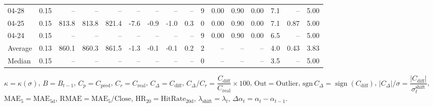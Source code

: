 \begin{threeparttable}
{\begin{tabular}{lrrrrrrrrrrrrrrr}
  04-28 &     0.15 &    -- &    -- &    -- &         -- &             -- &                       -- &                  -- &              9 &       0.00 &      0.90 &           0.00 &              7.1 &              -- &                   5.00 \\
  04-25 &     0.15 & 813.8 & 813.8 & 821.4 &       -7.6 &           -0.9 &                     -1.0 &                 0.3 &              0 &       0.00 &      0.90 &           0.00 &              7.1 &            0.87 &                   5.00 \\
  04-24 &     0.15 &    -- &    -- &    -- &         -- &             -- &                       -- &                  -- &              9 &       0.00 &      0.90 &           0.00 &              6.5 &              -- &                   5.00 \\
Average &     0.13 & 860.1 & 860.3 & 861.5 &       -1.3 &           -0.1 &                     -0.1 &                 0.2 &              2 &         -- &        -- &             -- &              4.0 &            0.43 &                   3.83 \\
 Median &     0.15 &    -- &    -- &    -- &         -- &             -- &                       -- &                  -- &              0 &         -- &        -- &             -- &              3.5 &              -- &                   5.00 \\
\bottomrule
\end{tabular}
}
\begin{tablenotes}\footnotesize
\item $\kappa=\kappa(\sigma)$, $B=B_{t-1}$, $C_p=C_{\text{pred}}$, $C_r=C_{\text{real}}$, $C_\Delta=C_{\text{diff}}$, $C_\Delta/C_r=\dfrac{C_{\text{diff}}}{C_{\text{real}}}\times100$, $\mathrm{Out}=\text{Outlier}$, $\mathrm{sgn}\,C_\Delta=\operatorname{sign}(C_{\text{diff}})$, $|C_\Delta|/\sigma=\dfrac{|C_{\text{diff}}|}{\sigma_t^{\text{shift}}}$, $\mathrm{MAE}_5=\mathrm{MAE}_{5\text{d}}$, $\mathrm{RMAE}= \mathrm{MAE}_5 / \text{Close}$, $\mathrm{HR}_{20}=\mathrm{HitRate}_{20\text{d}}$, 
$\lambda_{\text{shift}}=\lambda_t$, 
$\Delta\alpha_t=\alpha_t-\alpha_{t-1}$.
\end{tablenotes}
\end{threeparttable}
\endgroup

